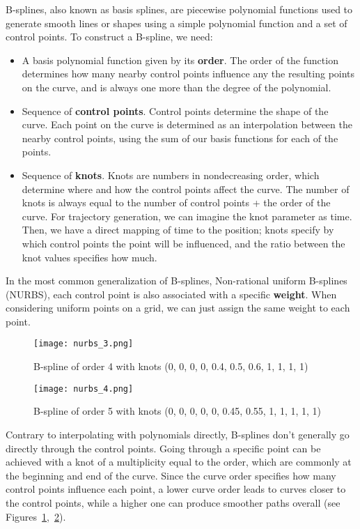 B-splines, also known as basis splines, are piecewise polynomial functions used to generate smooth lines or shapes using a simple polynomial function and a set of control points.
To construct a B-spline, we need:

\begin{itemize}
\item A basis polynomial function given by its \textbf{order}. The order of the function determines how many nearby control points influence any the resulting points on the curve, and is always one more than the degree of the polynomial.
\item Sequence of \textbf{control points}. Control points determine the shape of the curve. Each point on the curve is determined as an interpolation between the nearby control points, using the sum of our basis functions for each of the points.
\item Sequence of \textbf{knots}. Knots are numbers in nondecreasing order, which determine where and how the control points affect the curve. The number of knots is always equal to the number of control points + the order of the curve. For trajectory generation, we can imagine the knot parameter as time. Then, we have a direct mapping of time to the position; knots specify by which control points the point will be influenced, and the ratio between the knot values specifies how much.
\end{itemize}

In the most common generalization of B-splines, Non-rational uniform B-splines (NURBS), each control point is also associated with a specific \textbf{weight}. When considering uniform points on a grid, we can just assign the same weight to each point.

\begin{figure}
  \centering
  \texttt{[image: nurbs\_3.png]}
  \caption{B-spline of order 4 with knots (0, 0, 0, 0, 0.4, 0.5, 0.6, 1, 1, 1, 1)}\label{fig:nurbs4}
\end{figure}

\begin{figure}
  \centering
  \texttt{[image: nurbs\_4.png]}
  \caption{B-spline of order 5 with knots (0, 0, 0, 0, 0, 0.45, 0.55, 1, 1, 1, 1, 1)}\label{fig:nurbs5}
\end{figure}

Contrary to interpolating with polynomials directly, B-splines don't generally go directly through the control points. Going through a specific point can be achieved with a knot of a multiplicity equal to the order, which are commonly at the beginning and end of the curve. Since the curve order specifies how many control points influence each point, a lower curve order leads to curves closer to the control points, while a higher one can produce smoother paths overall (see Figures~\ref{fig:nurbs4},~\ref{fig:nurbs5}).


